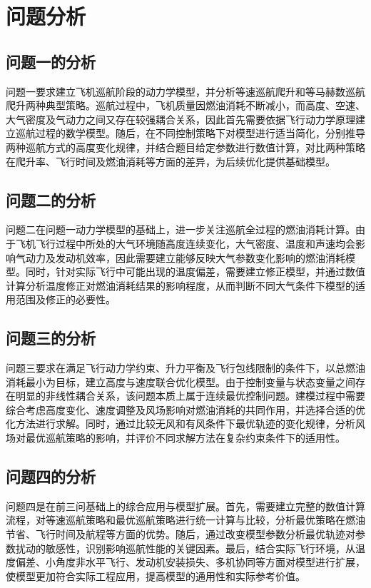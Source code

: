 \documentclass[UTF8]{ctexart}
\begin{document}
\section{问题分析}

\subsection{问题一的分析}
问题一要求建立飞机巡航阶段的动力学模型，并分析等速巡航爬升和等马赫数巡航爬升两种典型策略。巡航过程中，飞机质量因燃油消耗不断减小，而高度、空速、大气密度及气动力之间又存在较强耦合关系，因此首先需要依据飞行动力学原理建立巡航过程的数学模型。随后，在不同控制策略下对模型进行适当简化，分别推导两种巡航方式的高度变化规律，并结合题目给定参数进行数值计算，对比两种策略在爬升率、飞行时间及燃油消耗等方面的差异，为后续优化提供基础模型。

\subsection{问题二的分析}
问题二在问题一动力学模型的基础上，进一步关注巡航全过程的燃油消耗计算。由于飞机飞行过程中所处的大气环境随高度连续变化，大气密度、温度和声速均会影响气动力及发动机效率，因此需要建立能够反映大气参数变化影响的燃油消耗模型。同时，针对实际飞行中可能出现的温度偏差，需要建立修正模型，并通过数值计算分析温度修正对燃油消耗结果的影响程度，从而判断不同大气条件下模型的适用范围及修正的必要性。

\subsection{问题三的分析}
问题三要求在满足飞行动力学约束、升力平衡及飞行包线限制的条件下，以总燃油消耗最小为目标，建立高度与速度联合优化模型。由于控制变量与状态变量之间存在明显的非线性耦合关系，该问题本质上属于连续最优控制问题。建模过程中需要综合考虑高度变化、速度调整及风场影响对燃油消耗的共同作用，并选择合适的优化方法进行求解。同时，通过比较无风和有风条件下最优轨迹的变化规律，分析风场对最优巡航策略的影响，并评价不同求解方法在复杂约束条件下的适用性。

\subsection{问题四的分析}
问题四是在前三问基础上的综合应用与模型扩展。首先，需要建立完整的数值计算流程，对等速巡航策略和最优巡航策略进行统一计算与比较，分析最优策略在燃油节省、飞行时间及航程等方面的优势。随后，通过改变模型参数分析最优轨迹对参数扰动的敏感性，识别影响巡航性能的关键因素。最后，结合实际飞行环境，从温度偏差、小角度非水平飞行、发动机安装损失、多机协同等方面对模型进行扩展，使模型更加符合实际工程应用，提高模型的通用性和实际参考价值。
\end{document}
